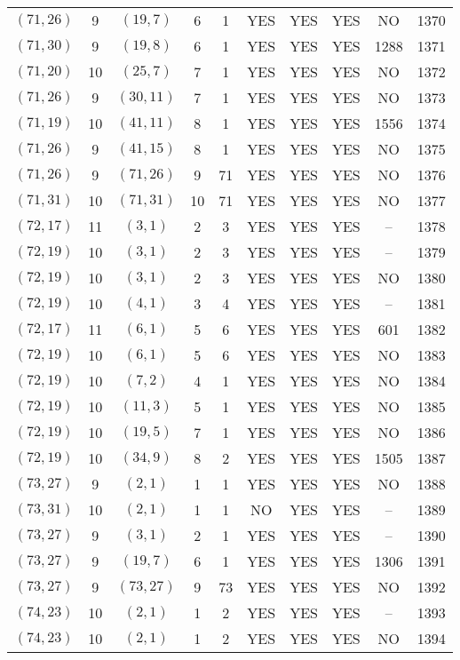 \begin{longtable}{|c|c|c|c|c|c|c|c|c|c|}
$(71, 26)$ & 9 & $(19, 7)$ & 6 & 1 & YES & YES & YES & NO & 1370\\
$(71, 30)$ & 9 & $(19, 8)$ & 6 & 1 & YES & YES & YES & 1288 & 1371\\
$(71, 20)$ & 10 & $(25, 7)$ & 7 & 1 & YES & YES & YES & NO & 1372\\
$(71, 26)$ & 9 & $(30, 11)$ & 7 & 1 & YES & YES & YES & NO & 1373\\
$(71, 19)$ & 10 & $(41, 11)$ & 8 & 1 & YES & YES & YES & 1556 & 1374\\
$(71, 26)$ & 9 & $(41, 15)$ & 8 & 1 & YES & YES & YES & NO & 1375\\
$(71, 26)$ & 9 & $(71, 26)$ & 9 & 71 & YES & YES & YES & NO & 1376\\
$(71, 31)$ & 10 & $(71, 31)$ & 10 & 71 & YES & YES & YES & NO & 1377\\
$(72, 17)$ & 11 & $(3, 1)$ & 2 & 3 & YES & YES & YES & -- & 1378\\
$(72, 19)$ & 10 & $(3, 1)$ & 2 & 3 & YES & YES & YES & -- & 1379\\
$(72, 19)$ & 10 & $(3, 1)$ & 2 & 3 & YES & YES & YES & NO & 1380\\
$(72, 19)$ & 10 & $(4, 1)$ & 3 & 4 & YES & YES & YES & -- & 1381\\
$(72, 17)$ & 11 & $(6, 1)$ & 5 & 6 & YES & YES & YES & 601 & 1382\\
$(72, 19)$ & 10 & $(6, 1)$ & 5 & 6 & YES & YES & YES & NO & 1383\\
$(72, 19)$ & 10 & $(7, 2)$ & 4 & 1 & YES & YES & YES & NO & 1384\\
$(72, 19)$ & 10 & $(11, 3)$ & 5 & 1 & YES & YES & YES & NO & 1385\\
$(72, 19)$ & 10 & $(19, 5)$ & 7 & 1 & YES & YES & YES & NO & 1386\\
$(72, 19)$ & 10 & $(34, 9)$ & 8 & 2 & YES & YES & YES & 1505 & 1387\\
$(73, 27)$ & 9 & $(2, 1)$ & 1 & 1 & YES & YES & YES & NO & 1388\\
$(73, 31)$ & 10 & $(2, 1)$ & 1 & 1 & NO & YES & YES & -- & 1389\\
$(73, 27)$ & 9 & $(3, 1)$ & 2 & 1 & YES & YES & YES & -- & 1390\\
$(73, 27)$ & 9 & $(19, 7)$ & 6 & 1 & YES & YES & YES & 1306 & 1391\\
$(73, 27)$ & 9 & $(73, 27)$ & 9 & 73 & YES & YES & YES & NO & 1392\\
$(74, 23)$ & 10 & $(2, 1)$ & 1 & 2 & YES & YES & YES & -- & 1393\\
$(74, 23)$ & 10 & $(2, 1)$ & 1 & 2 & YES & YES & YES & NO & 1394\\

\end{longtable}
